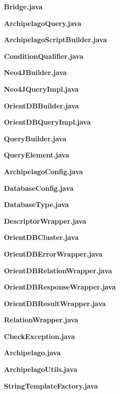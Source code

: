 \textbf{Bridge.java}

\textbf{ArchipelagoQuery.java}

\textbf{ArchipelagoScriptBuilder.java}

\textbf{ConditionQualifier.java}

\textbf{Neo4JBuilder.java}

\textbf{Neo4JQueryImpl.java}

\textbf{OrientDBBuilder.java}

\textbf{OrientDBQueryImpl.java}

\textbf{QueryBuilder.java}

\textbf{QueryElement.java}

\textbf{ArchipelagoConfig.java}

\textbf{DatabaseConfig.java}

\textbf{DatabaseType.java}

\textbf{DescriptorWrapper.java}

\textbf{OrientDBCluster.java}

\textbf{OrientDBErrorWrapper.java}

\textbf{OrientDBRelationWrapper.java}

\textbf{OrientDBResponseWrapper.java}

\textbf{OrientDBResultWrapper.java}

\textbf{RelationWrapper.java}

\textbf{CheckException.java}

\textbf{Archipelago.java}

\textbf{ArchipelagoUtils.java}

\textbf{StringTemplateFactory.java}

